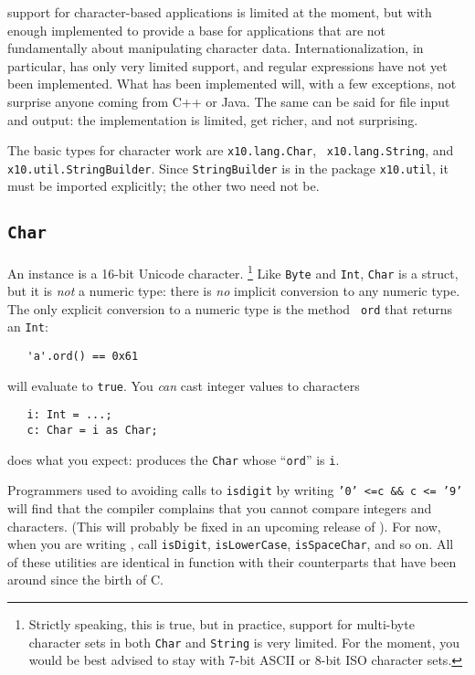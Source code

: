 \Xten{} support for character-based applications is limited at the moment, but
with enough implemented to provide a base for applications that are not
fundamentally about manipulating character data.  Internationalization,
in particular, has only very limited support, and regular expressions have
not yet been implemented. What has been implemented will, with a few exceptions,
not surprise anyone coming from C++ or Java. The same can be said for file input
and output: the implementation is limited, get richer, and not surprising.

The basic types for character work are {\tt x10.lang.Char}, {\tt
x10.lang.String}, and  {\tt x10.util.StringBuilder}. Since {\tt StringBuilder}
is in the package {\tt x10.util}, it must be imported explicitly; the other two
need not be.

\subsection{\tt Char} An instance is a 16-bit Unicode character.
\footnote{Strictly speaking, this is true, but in practice, support for
multi-byte character sets in both {\tt Char} and {\tt String} is very limited. 
For the moment, you would be best advised to stay with 7-bit ASCII or 8-bit ISO
character sets.} Like {\tt Byte} and {\tt Int}, {\tt Char} is a struct, but it
is {\em not} a numeric type: there is {\em no} implicit conversion to any
numeric type. The only explicit conversion to a numeric type is the method {\tt
ord} that returns an {\tt Int}:
\begin{verbatim}
   'a'.ord() == 0x61
\end{verbatim}
will evaluate to {\tt true}. You {\em can} cast integer values to characters
\begin{verbatim} 
   i: Int = ...;
   c: Char = i as Char;
\end{verbatim}
does what you expect: produces the {\tt Char} whose ``{\tt ord}'' is {\tt i}.  

Programmers used to avoiding calls to  {\tt isdigit} by writing 
{\tt '0' <=c \&\& c <= '9'} will find that the compiler
complains that you cannot compare integers and characters.  (This will probably be
fixed in an upcoming release of \Xten{}).  For now, when you
are writing \Xten{}, call {\tt isDigit}, {\tt isLowerCase}, {\tt isSpaceChar},
and so on.   All of these utilities are identical in function with their
counterparts that have been around since the birth of C. 

